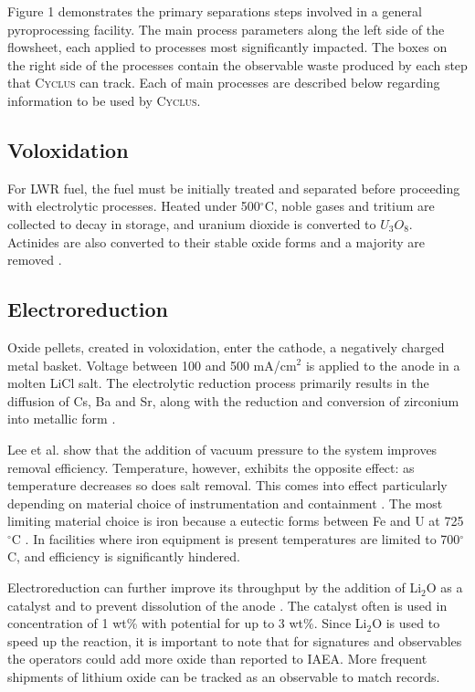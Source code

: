 \documentclass{anstrans}
\newcommand{\Cyclus}{\textsc{Cyclus}\xspace}%
\begin{document}
Figure 1 demonstrates the primary separations steps involved in a general pyroprocessing facility. The main process 
parameters along the left side of the flowsheet, each applied to processes most significantly impacted. The boxes on the 
right side of the processes contain the observable waste produced by each step that \Cyclus can track. Each of main processes 
are described below regarding information to be used by \Cyclus.

\subsection{Voloxidation}

For LWR fuel, the fuel must be initially treated and separated before proceeding with electrolytic processes. Heated under 
500$^{\circ}$C, noble gases and tritium are collected to decay in storage, and uranium dioxide is converted to $U_3O_8$. 
Actinides are also converted to their stable oxide forms and a majority are removed \cite{flowsheet_1998}. 

\subsection{Electroreduction}

Oxide pellets, created in voloxidation, enter the cathode, a negatively charged metal basket. Voltage between 100 and 500 mA/cm$^2$ is applied 
to the anode in a molten LiCl salt. The electrolytic reduction process primarily results in the diffusion of Cs, Ba and Sr, 
along with the reduction and conversion of zirconium into metallic form \cite{choi_electrochemical_2015,flowsheet_1998}.

Lee et al. \cite{lee_advanced_2008} show that the addition of vacuum pressure to the system improves removal efficiency. Temperature, however, 
exhibits the opposite effect: as temperature decreases so does salt removal. This comes into effect particularly 
depending on material choice of instrumentation and containment \cite{lee_advanced_2008}. The most limiting material choice 
is iron because a eutectic forms between Fe and U at 725$^{\circ}$C \cite{chapman_revision_1984}. In facilities where iron 
equipment is present temperatures are limited to 700$^{\circ}$C, and efficiency is significantly hindered.

Electroreduction can further improve its throughput by the addition of Li$_2$O as a catalyst and to prevent dissolution 
of the anode \cite{choi_electrochemical_2015}. The catalyst often is used in concentration of 1 wt\% with potential for 
up to 3 wt\%. Since Li$_2$O is used to speed up the reaction, it is important to note that for signatures and observables 
the operators could add more oxide than reported to IAEA. More frequent shipments of lithium oxide can be tracked as an 
observable to match records.
\end{document}
